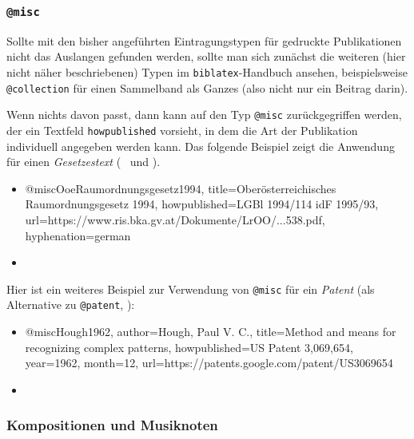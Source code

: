 
\subsubsection{\texttt{@misc}}
\label{sec:@misc}

Sollte mit den bisher angeführten Eintragungstypen für gedruckte Publikationen
nicht das Auslangen gefunden werden, sollte man sich zunächst die weiteren (hier nicht näher beschriebenen) 
Typen im \texttt{biblatex}-Handbuch \cite{Kime2020} ansehen, beispielsweise
\texttt{@collection} für einen Sammelband als Ganzes (also nicht nur ein Beitrag darin).

Wenn nichts davon passt, dann kann auf den Typ \texttt{@misc} zurückgegriffen werden, der ein
Textfeld \texttt{howpublished} vorsieht, in dem die Art der Publikation individuell 
angegeben werden kann. Das folgende Beispiel zeigt die Anwendung für einen \emph{Gesetzestext} 
(\sa\ \cite{FhStG1993} und \cite{EuRichtlinie2000}).
%
\begin{itemize}
\item[]
\begin{GenericCode}[numbers=none]
@misc{OoeRaumordnungsgesetz1994,
  title={Oberösterreichisches Raumordnungsgesetz 1994},
  howpublished={LGBl 1994/114 idF 1995/93},
  url={https://www.ris.bka.gv.at/Dokumente/LrOO/...538.pdf},
  hyphenation={german}
}
\end{GenericCode}
\item[\cite{OoeRaumordnungsgesetz1994}] 
\end{itemize}
%
Hier ist ein weiteres Beispiel zur Verwendung von \texttt{@misc} für ein \emph{Patent} (als Alternative zu \texttt{@patent}, \so):
%
\begin{itemize}
\item[]
\begin{GenericCode}[numbers=none]
@misc{Hough1962,
	author={Hough, Paul V. C.},
	title={Method and means for recognizing complex patterns},
	howpublished={US Patent 3,069,654},
	year={1962},
	month={12},
	url={https://patents.google.com/patent/US3069654}
}
\end{GenericCode}
\item[\cite{Hough1962}] 
\end{itemize}


\subsubsection{Kompositionen und Musiknoten}
\label{sec:Musiknoten}

